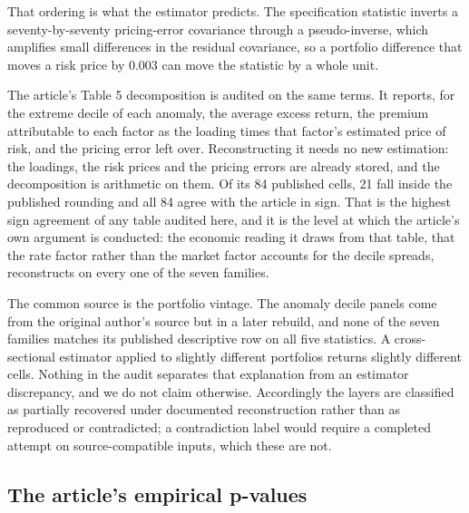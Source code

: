\documentclass[11pt]{article}
\begin{document}
That ordering is what the estimator predicts. The specification statistic inverts
a seventy-by-seventy pricing-error covariance through a pseudo-inverse, which
amplifies small differences in the residual covariance, so a portfolio difference
that moves a risk price by 0.003 can move the statistic by a whole unit. %

The article's Table 5 decomposition is audited on the same terms. It reports, %
for the extreme decile of each anomaly, the average excess return, the premium
attributable to each factor as the loading times that factor's estimated price of
risk, and the pricing error left over. Reconstructing it needs no new estimation:
the loadings, the risk prices and the pricing errors are already stored, and the
decomposition is arithmetic on them. Of its 84 published cells, 21 fall inside %
the published rounding and all 84 agree with the article in sign. That is the %
highest sign agreement of any table audited here, and it is the level at which
the article's own argument is conducted: the economic reading it draws from that
table, that the rate factor rather than the market factor accounts for the decile
spreads, reconstructs on every one of the seven families.

The common source is the portfolio vintage. The anomaly decile panels come from
the original author's source but in a later rebuild, and none of the seven
families matches its published descriptive row on all five statistics. A
cross-sectional estimator applied to slightly different portfolios returns
slightly different cells. Nothing in the audit separates that explanation from an
estimator discrepancy, and we do not claim otherwise. Accordingly the layers are
classified as partially recovered under documented reconstruction rather than as
reproduced or contradicted; a contradiction label would require a completed
attempt on source-compatible inputs, which these are not. %

\subsection{The article's empirical p-values}
\end{document}
